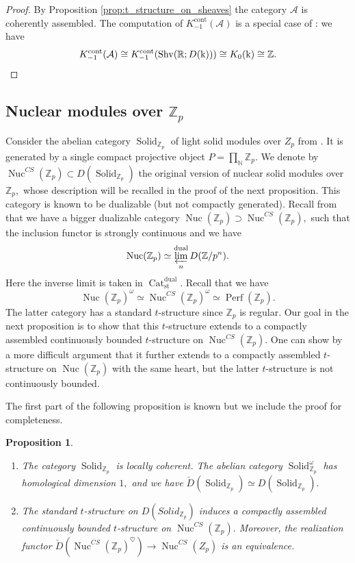 \documentclass[11pt,leqno]{amsart}
\newtheorem{prop}[theo]{Proposition}
\numberwithin{equation}{section}
\def\N{\mathbb{N}}
\def\R{\mathbb{R}}
\def\Z{\mathbb{Z}}
\newcommand{\prolim}[1][]{\mathop{\varprojlim}\limits_{#1}}
\newcommand{\prodd}[1][]{\mathop{\prod}\limits_{#1}}
\newcommand{\Nuc}{\operatorname{Nuc}}
\newcommand{\Solid}{\operatorname{Solid}}
\newcommand{\Cat}{\operatorname{Cat}}
\newcommand{\cont}{\operatorname{cont}}
\newcommand{\st}{\operatorname{st}}
\newcommand{\dual}{\operatorname{dual}}
\newcommand{\mk}{\mathrm k}
\newcommand{\cA}{{\mathcal A}}
\newcommand{\Perf}{\operatorname{Perf}}
\newcommand{\Shv}{\operatorname{Shv}}
\begin{document}
\begin{proof}
By Proposition \ref{prop:t_structure_on_sheaves} the category $\cA$ is coherently assembled. The computation of $K_{-1}^{\cont}(\cA)$ is a special case of \cite[Proposition 4.18]{E24}: we have
\begin{equation*}
K_{-1}^{\cont}(\cA)\cong K_{-1}^{\cont}(\Shv(\R;D(\mk)))\cong K_0(\mk)\cong\Z.\qedhere
\end{equation*}
\end{proof}

\subsection{Nuclear modules over $\Z_p$}

Consider the abelian category $\Solid_{\Z_p}$ of light solid modules over $Z_p$ from \cite{CS20, CS24}. It is generated by a single compact projective object $P=\prodd[\N]\Z_p.$ We denote by $\Nuc^{CS}(\Z_p)\subset D(\Solid_{\Z_p})$ the original version of nuclear solid modules over $\Z_p,$ whose description will be recalled in the proof of the next proposition. This category is known to be dualizable (but not compactly generated). Recall from \cite{E25a} that we have a bigger dualizable category $\Nuc(\Z_p)\supset\Nuc^{CS}(\Z_p),$ such that the inclusion functor is strongly continuous and we have
\begin{equation*}
\Nuc(\Z_p)\simeq\prolim[n]^{\dual}D(\Z/p^n).
\end{equation*}
Here the inverse limit is taken in $\Cat_{\st}^{\dual}.$ Recall that we have
\begin{equation*}
\Nuc(\Z_p)^{\omega}\simeq\Nuc^{CS}(\Z_p)^{\omega}\simeq\Perf(\Z_p).
\end{equation*}
The latter category has a standard $t$-structure since $\Z_p$ is regular. Our goal in the next proposition is to show that this $t$-structure extends to a compactly assembled continuously bounded $t$-structure on $\Nuc^{CS}(\Z_p).$ One can show by a more difficult argument that it further extends to a compactly assembled $t$-structure on $\Nuc(\Z_p)$ with the same heart, but the latter $t$-structure is not continuously bounded. 

The first part of the following proposition is known but we include the proof for completeness. %

\begin{prop}\label{prop:t_structure_on_Nuc_of_Z_p}
\begin{enumerate}[label=(\roman*),ref=(\roman*)]
\item The category $\Solid_{\Z_p}$ is locally coherent. The abelian category $\Solid_{\Z_p}^{\omega}$ has homological dimension $1,$ and we have $\check{D}(\Solid_{\Z_p})\simeq D(\Solid_{\Z_p}).$ \label{solid_is_locally_coherent}
\item The standard $t$-structure on $D(Solid_{\Z_p})$ induces a compactly assembled continuously bounded $t$-structure on $\Nuc^{CS}(\Z_p).$ Moreover, the realization functor $\check{D}(\Nuc^{CS}(\Z_p)^{\heartsuit})\to \Nuc^{CS}(Z_p)$ is an equivalence. \label{nuc_is_coherently_assembled}
\end{enumerate}
\end{prop}
\end{document}
